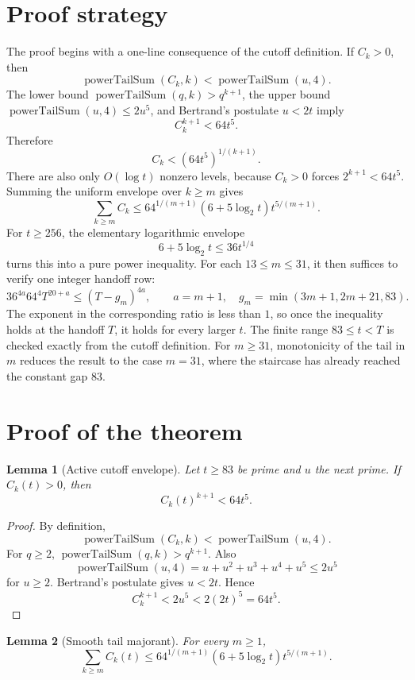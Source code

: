 \documentclass[11pt]{article}
\newtheorem{lemma}{Lemma}
\newcommand{\Pow}{\operatorname{powerTailSum}}
\begin{document}
\section{Proof strategy}

The proof begins with a one-line consequence of the cutoff definition.  If
\(C_k>0\), then
\[
  \Pow(C_k,k)<\Pow(u,4).
\]
The lower bound \(\Pow(q,k)>q^{k+1}\), the upper bound
\(\Pow(u,4)\le2u^5\), and Bertrand's postulate \(u<2t\) imply
\[
  C_k^{k+1}<64t^5.
\]
Therefore
\[
  C_k<(64t^5)^{1/(k+1)}.
\]
There are also only \(O(\log t)\) nonzero levels, because \(C_k>0\) forces
\(2^{k+1}<64t^5\).  Summing the uniform envelope over \(k\ge m\) gives
\[
  \sum_{k\ge m}C_k
  \le
  64^{1/(m+1)}(6+5\log_2 t)t^{5/(m+1)}.
\]
For \(t\ge256\), the elementary logarithmic envelope
\[
  6+5\log_2 t\le 36t^{1/4}
\]
turns this into a pure power inequality.  For each \(13\le m\le31\), it
then suffices to verify one integer handoff row:
\[
  36^{4a}64^4T^{20+a}\le (T-g_m)^{4a},
  \qquad a=m+1,\quad g_m=\min(3m+1,2m+21,83).
\]
The exponent in the corresponding ratio is less than \(1\), so once the
inequality holds at the handoff \(T\), it holds for every larger \(t\).  The
finite range \(83\le t<T\) is checked exactly from the cutoff definition.
For \(m\ge31\), monotonicity of the tail in \(m\) reduces the result to the
case \(m=31\), where the staircase has already reached the constant gap
\(83\).

\section{Proof of the theorem}

\begin{lemma}[Active cutoff envelope]
\label{lem:active-envelope}
Let \(t\ge83\) be prime and \(u\) the next prime.  If \(C_k(t)>0\), then
\[
  C_k(t)^{k+1}<64t^5.
\]
\end{lemma}

\begin{proof}
By definition,
\[
  \Pow(C_k,k)<\Pow(u,4).
\]
For \(q\ge2\), \(\Pow(q,k)>q^{k+1}\).  Also
\[
  \Pow(u,4)=u+u^2+u^3+u^4+u^5\le2u^5
\]
for \(u\ge2\).  Bertrand's postulate gives \(u<2t\).  Hence
\[
  C_k^{k+1}<2u^5<2(2t)^5=64t^5.
\]
\end{proof}

\begin{lemma}[Smooth tail majorant]
\label{lem:smooth-tail}
For every \(m\ge1\),
\[
  \sum_{k\ge m}C_k(t)
  \le
  64^{1/(m+1)}(6+5\log_2 t)t^{5/(m+1)}.
\]
\end{lemma}
\end{document}
